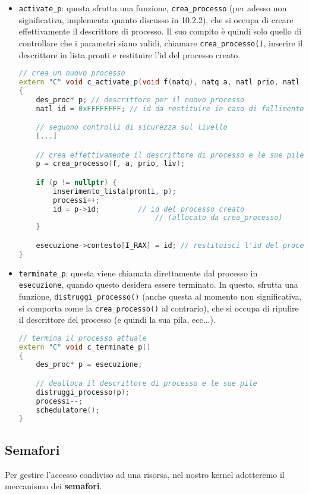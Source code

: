 \documentclass[a4paper,11pt]{article}
\begin{document}
\begin{itemize}
	\item \lstinline|activate_p|: questa sfrutta una funzione, \lstinline|crea_processo| (per adesso non significativa, implementa quanto discusso in 10.2.2), che si occupa di creare effettivamente il descrittore di processo.
		Il suo compito è quindi solo quello di controllare che i parametri siano validi, chiamare \lstinline|crea_processo()|, inserire il descrittore in lista pronti e restituire l'id del processo creato.
\begin{lstlisting}[language=C++, style=codestyle]	
// crea un nuovo processo
extern "C" void c_activate_p(void f(natq), natq a, natl prio, natl liv)
{
	des_proc* p; // descrittore per il nuovo processo
	natl id = 0xFFFFFFFF; // id da restituire in caso di fallimento

	// seguono controlli di sicurezza sul livello
	[...]

	// crea effettivamente il descrittore di processo e le sue pile
	p = crea_processo(f, a, prio, liv);

	if (p != nullptr) {
		inserimento_lista(pronti, p);
		processi++;
		id = p->id;			// id del processo creato
						        // (allocato da crea_processo)
	}

	esecuzione->contesto[I_RAX] = id; // restituisci l'id del processo
}
\end{lstlisting}
\item \lstinline|terminate_p|: questa viene chiamata direttamente dal processo in \lstinline|esecuzione|, quando questo desidera essere terminato. 
	In questo, sfrutta una funzione, \lstinline|distruggi_processo()| (anche questa al momento non significativa, si comporta come la \lstinline|crea_processo()| al contrario), che si occupa di ripulire il descrittore del processo (e quindi la sua pila, ecc...).
\begin{lstlisting}[language=C++, style=codestyle]	
// termina il processo attuale 
extern "C" void c_terminate_p()
{
	des_proc* p = esecuzione;

	// dealloca il descrittore di processo e le sue pile
	distruggi_processo(p);
	processi--;
	schedulatore();
}
\end{lstlisting}
\end{itemize}

\subsection{Semafori}
Per gestire l'accesso condiviso ad una risorsa, nel nostro kernel adotteremo il meccanismo dei \textbf{semafori}.
\end{document}
